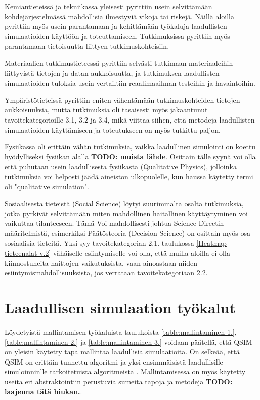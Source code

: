 \documentclass[utf8]{gradu3}
\begin{document}
Kemiantieteissä ja tekniikassa yleisesti 
pyrittiin usein selvittämään kohdejärjestelmässä mahdollisia 
ilmestyviä vikoja tai riskejä.
Näillä aloilla pyrittiin myös usein parantamaan ja 
kehittämään työkaluja laadullisten simulaatioiden käyttöön ja toteuttamiseen.
Tutkimuksissa pyrittiin myös parantamaan tietoisuutta liittyen tutkimuskohteisiin.

Materiaalien tutkimustieteessä pyrittiin selvästi 
tutkimaan materiaaleihin  liittyvistä tietojen ja datan aukkoisuutta, 
ja tutkimuksen laadullisten simulaatioiden tuloksia usein vertailtiin reaalimaailman testeihin ja havaintoihin.

Ympäristötieteissä pyrittiin eniten vähentämään tutkimuskohteiden tietojen aukkoisuuksia, mutta tutkimuksia oli tasaisesti myös jakaantunut tavoitekategorioille 3.1, 3.2 ja 3.4, mikä viittaa siihen, että
metodeja laadullisten simulaatioiden käyttämiseen ja toteutukseen on myös
tutkittu paljon.

Fysiikassa oli erittäin vähän tutkimuksia, vaikka laadullinen simulointi on koettu hyödylliseksi fysiikan alalla \textbf{TODO: muista lähde}. 
Osittain tälle syynä voi olla
että puhutaan usein laadullisesta fysiikasta (Qualitative Physics), jolloinka tutkimuksia voi helposti jäädä aineiston ulkopuolelle, 
kun haussa käytetty termi oli "qualitative simulation".

Sosiaalisesta tieteistä (Social Science) löytyi suurimmalta osalta tutkimuksia, 
jotka pyrkivät selvittämään miten mahdollinen haitallinen käyttäytyminen voi vaikuttaa tilanteeseen. Tämä Voi mahdollisesti johtua Science Directin määritelmistä, esimerkiksi
Päätösteoria (Decision Science) on osittain myös osa sosiaalisia tieteitä. 
Yksi syy tavoitekategorian 2.1. taulukossa \ref{Heatmap tieteenalat v.2}
vähäiselle esiintymiselle voi olla, 
että muilla aloilla ei olla kiinnostuneita haittojen vaikutuksista,
vaan ainoastaan niiden esiintymismahdollisuuksista, 
jos verrataan tavoitekategoriaan 2.2.

\section{Laadullisen simulaation työkalut}
Löydetyistä mallintamisen työkaluista taulukoista \ref{table:mallintaminen 1.},
\ref{table:mallintaminen 2.} ja \ref{table:mallintaminen 3.} voidaan päätellä, 
että QSIM on yleisin käytetty tapa mallintaa laadullisia simulaatioita.
On selkeää, että QSIM on erittäin tunnettu algoritmi ja yksi ensimmäisistä
laadullisille simuloinninlle tarkoitetuista algoritmeista
\parencite{kuipers1986qualitative}.
Mallintamisessa on myös käytetty useita eri abstraktointiin perustuvia sumeita tapoja ja metodeja \textbf{TODO: laajenna tätä hiukan.}. 
\end{document}
